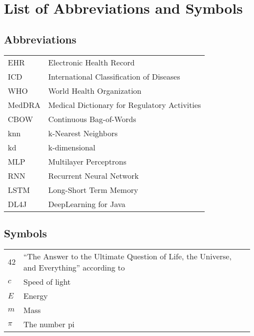 \documentclass[master=ecws,masteroption=ai]{kulemt}
\begin{document}
\begin{preface}
 \lipsum[1]
\end{preface}

\tableofcontents*

\begin{abstract}

  \lipsum[1]
\end{abstract}

\listoffiguresandtables
\chapter{List of Abbreviations and Symbols}
\section*{Abbreviations}
\begin{flushleft}
  \renewcommand{\arraystretch}{1.1}
  \begin{tabularx}{\textwidth}{@{}p{12mm}X@{}}
    EHR   & Electronic Health Record \\
    ICD   & International Classification of Diseases \\
    WHO  & World Health Organization \\
    MedDRA & Medical Dictionary for Regulatory Activities \\
    CBOW & Continuous Bag-of-Words \\
    knn & k-Nearest Neighbors \\
    kd & k-dimensional \\
    MLP & Multilayer Perceptrons \\
    RNN & Recurrent Neural Network \\
    LSTM & Long-Short Term Memory \\
    DL4J & DeepLearning for Java \\
  \end{tabularx}
\end{flushleft}
\section*{Symbols}
\begin{flushleft}
  \renewcommand{\arraystretch}{1.1}
  \begin{tabularx}{\textwidth}{@{}p{12mm}X@{}}
    42    & ``The Answer to the Ultimate Question of Life, the Universe,
            and Everything'' according to \cite{h2g2} \\
    $c$   & Speed of light \\
    $E$   & Energy \\
    $m$   & Mass \\
    $\pi$ & The number pi \\
  \end{tabularx}
\end{flushleft}
\end{document}
